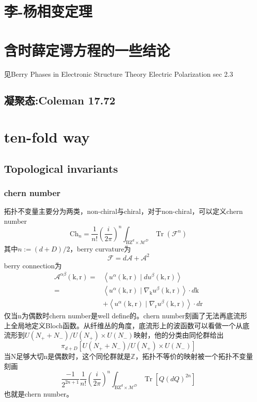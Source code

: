 \documentclass[10pt,openany]{book}
\theoremstyle{thmstyle} %
\theoremstyle{defstyle} %
\theoremstyle{prostyle} %
\begin{document}
\section{李-杨相变定理}
\section{含时薛定谔方程的一些结论}
见Berry Phases in Electronic Structure Theory Electric Polarization sec 2.3
\subsection{凝聚态:Coleman 17.72}
\section{ten-fold way}
\subsection{Topological invariants}
\subsubsection*{chern number}
拓扑不变量主要分为两类，non-chiral与chiral，对于non-chiral，可以定义chern number
\begin{equation}
  \mathrm{Ch}_n=\frac{1}{n!}\left(\frac{i}{2 \pi}\right)^n \int_{\mathrm{BZ}^d \times \mathcal{M}^D} \operatorname{Tr}\left(\mathcal{F}^n\right)
\end{equation}
其中$ n:=(d+D) / 2 $，berry curvature为
\begin{equation}
  \mathcal{F}=d \mathcal{A}+\mathcal{A}^2
\end{equation}
berry connection为
\begin{equation}
  \begin{aligned}
    \mathcal{A}^{\alpha \beta}(\mathrm{k}, \mathrm{r})= & \left\langle u^\alpha(\mathrm{k}, \mathrm{r}) \mid d u^\beta(\mathrm{k}, \mathrm{r})\right\rangle \\
    = & \left\langle u^\alpha(\mathrm{k}, \mathrm{r}) \mid \nabla_{\mathrm{k}} u^\beta(\mathrm{k}, \mathrm{r})\right\rangle \cdot d \mathrm{k} \\
    & +\left\langle u^\alpha(\mathrm{k}, \mathrm{r}) \mid \nabla_{\mathrm{r}} u^\beta(\mathrm{k}, \mathrm{r})\right\rangle \cdot d \mathrm{r}
    \end{aligned}
\end{equation}
仅当n为偶数时chern number是well define的。chern number刻画了无法再底流形上全局地定义Bloch函数。从纤维丛的角度，底流形上的波函数可以看做一个从底流形到$ U\left(N_{+}+N_{-}\right) / U\left(N_{+}\right) \times U\left(N_{-}\right) $映射，他的分类由同伦群给出
\begin{equation}
  \pi_{d+D}\left[U\left(N_{+}+N_{-}\right) / U\left(N_{+}\right) \times U\left(N_{-}\right)\right]
\end{equation}
当N足够大切n是偶数时，这个同伦群就是$ \mathbb{Z} $，拓扑不等价的映射被一个拓扑不变量刻画
\begin{equation}
  \frac{-1}{2^{2 n+1}} \frac{1}{n!}\left(\frac{i}{2 \pi}\right)^n \int_{\mathrm{BZ}^d \times \mathcal{M}^D} \operatorname{Tr}\left[Q(d Q)^{2 n}\right]
\end{equation}
也就是chern number。
\end{document}
